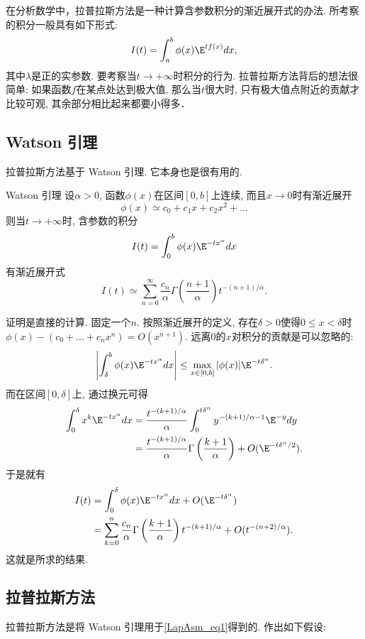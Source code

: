 

在分析数学中，拉普拉斯方法是一种计算含参数积分的渐近展开式的办法. 所考察的积分一般具有如下形式:
\begin{equation}\label{LapAsm_eq1}
I(t)=\int_a^b \phi(x)\E^{t f(x)}dx,
\end{equation}
其中$\lambda$是正的实参数. 要考察当$t\to+\infty$时积分的行为. 拉普拉斯方法背后的想法很简单: 如果函数$f$在某点处达到极大值, 那么当$t$很大时, 只有极大值点附近的贡献才比较可观, 其余部分相比起来都要小得多．

\subsection{Watson 引理}
拉普拉斯方法基于 Watson 引理. 它本身也是很有用的.

\begin{lemma}{Watson 引理}
设$\alpha>0$, 函数$\phi(x)$在区间$[0,b]$上连续, 而且$x\to0$时有渐近展开
$$
\phi(x)\simeq c_0+c_1x+c_2x^2+...
$$
则当$t\to+\infty$时, 含参数的积分
$$
I(t)=\int_0^b \phi(x)\E^{-t x^\alpha}dx
$$
有渐近展开式
$$
I(t)\simeq\sum_{n=0}^\infty \frac{c_n}{\alpha}\Gamma\left(\frac{n+1}{\alpha}\right)t^{-(n+1)/\alpha}.
$$
\end{lemma}

证明是直接的计算. 固定一个$n$. 按照渐近展开的定义, 存在$\delta>0$使得$0\leq x<\delta$时$\phi(x)-(c_0+...+c_nx^n)=O(x^{n+1})$. 远离$0$的$x$对积分的贡献是可以忽略的:
$$
\left|\int_\delta^b\phi(x)\E^{-tx^\alpha}dx\right|
\leq\max_{x\in[0,b]}|\phi(x)|\E^{-t\delta^\alpha}.
$$
而在区间$[0,\delta]$上, 通过换元可得
$$
\begin{aligned}
\int_0^\delta x^k\E^{-tx^\alpha}dx
&=\frac{t^{-(k+1)/\alpha}}{\alpha}\int_0^{t\delta^\alpha}y^{-(k+1)/\alpha-1}\E^{-y}dy\\
&=\frac{t^{-(k+1)/\alpha}}{\alpha}\Gamma\left(\frac{k+1}{\alpha}\right)+O(\E^{-t\delta^\alpha/2}).
\end{aligned}
$$
于是就有
$$
\begin{aligned}
I(t)
&=\int_0^\delta\phi(x)\E^{-tx^\alpha}dx+O(\E^{-t\delta^\alpha})\\
&=\sum_{k=0}^n\frac{c_n}{\alpha}\Gamma\left(\frac{k+1}{\alpha}\right)t^{-(k+1)/\alpha}+O(t^{-(n+2)/\alpha}).
\end{aligned}
$$
这就是所求的结果.

\subsection{拉普拉斯方法}
拉普拉斯方法是将 Watson 引理用于\autoref{LapAsm_eq1}得到的. 作出如下假设:

